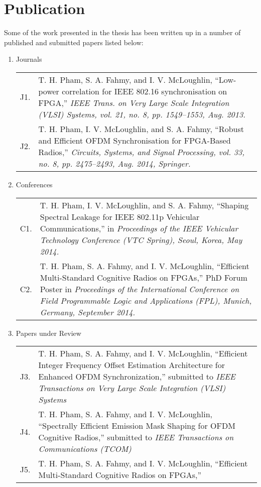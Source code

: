 \section{Publication}
Some of the work presented in the thesis has been written up in a number of published and submitted papers listed below:

\begin{enumerate}
\item Journals

\begin{tabular}{p{15pt}p{385pt}}
	J1. &  T. H. Pham, S. A. Fahmy, and I. V. McLoughlin, ``Low-power correlation for IEEE 802.16 synchronisation on FPGA,'' \textit{IEEE Trans. on Very Large Scale Integration (VLSI) Systems, vol. 21, no. 8, pp. 1549–1553, Aug. 2013.}\\
	J2. &  T. H. Pham, I. V. McLoughlin, and S. A. Fahmy, ``Robust and Efficient OFDM Synchronisation for FPGA-Based Radios,'' \textit{Circuits, Systems, and Signal Processing, vol. 33, no. 8, pp. 2475–2493, Aug. 2014, Springer.}\\
\end{tabular}

\item Conferences

\begin{tabular}{p{15pt}p{385pt}}
	C1. & T. H. Pham, I. V. McLoughlin, and S. A. Fahmy, ``Shaping Spectral Leakage for IEEE 802.11p Vehicular Communications,'' in \textit{Proceedings of the IEEE Vehicular Technology Conference (VTC Spring), Seoul, Korea, May 2014.}\\
	C2. & T. H. Pham, S. A. Fahmy, and I. V. McLoughlin, ``Efficient Multi-Standard Cognitive Radios on FPGAs,'' PhD Forum Poster in \textit{Proceedings of the International Conference on Field Programmable Logic and Applications (FPL), Munich, Germany, September 2014.}\\
\end{tabular}

\item Papers under Review

\begin{tabular}{p{15pt}p{385pt}}
	J3. & T. H. Pham, S. A. Fahmy, and I. V. McLoughlin, ``Efficient Integer Frequency Offset Estimation Architecture for Enhanced OFDM Synchronization,'' submitted to \textit{IEEE Transactions on Very Large Scale Integration (VLSI) Systems}\\
	J4. & T. H. Pham, S. A. Fahmy, and I. V. McLoughlin, ``Spectrally Efficient Emission Mask Shaping for OFDM Cognitive Radios,''  submitted to \textit{IEEE Transactions on Communications (TCOM)}\\
	J5. & T. H. Pham, S. A. Fahmy, and I. V. McLoughlin, ``Efficient Multi-Standard Cognitive Radios on FPGAs,'' \\
\end{tabular}

\end{enumerate}